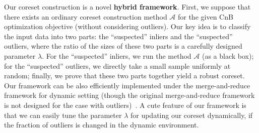 \documentclass{article}
\begin{document}

Our coreset construction is a novel \textbf{hybrid framework}. First, we suppose that there exists an ordinary coreset construction method $\mathcal{A}$ for the given CnB optimization objective (without considering outliers). Our key idea is to classify the input data into two parts: the ``suspected'' inliers and the ``suspected'' outliers, where the ratio of the sizes of these two parts is a carefully designed parameter $\lambda$. For the ``suspected'' inliers, we run the method $\mathcal{A}$ (as a black box); for the ``suspected'' outliers, we directly take a small sample uniformly at random; finally, we prove that these two parts together yield a robust coreset. Our framework can be also efficiently implemented under the merge-and-reduce framework for dynamic setting (though the original merge-and-reduce framework is not designed for the case with outliers)~\cite{BentleyS80,Har-PeledM04}. A cute feature of our framework is that we can easily tune the parameter $\lambda$ for updating our coreset dynamically, if the fraction of outliers is changed in the dynamic environment.
\end{document}
